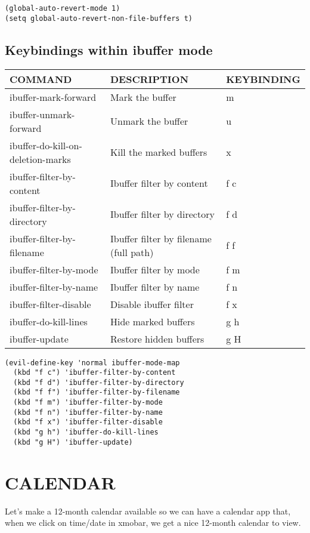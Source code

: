 \documentclass[11pt]{article}
\begin{document}
\begin{verbatim}
(global-auto-revert-mode 1)
(setq global-auto-revert-non-file-buffers t)
\end{verbatim}

\subsection{Keybindings within ibuffer mode}
\label{sec:org6013ae8}
\begin{center}
\begin{tabular}{lll}
COMMAND & DESCRIPTION & KEYBINDING\\[0pt]
\hline
ibuffer-mark-forward & Mark the buffer & m\\[0pt]
ibuffer-unmark-forward & Unmark the buffer & u\\[0pt]
ibuffer-do-kill-on-deletion-marks & Kill the marked buffers & x\\[0pt]
ibuffer-filter-by-content & Ibuffer filter by content & f c\\[0pt]
ibuffer-filter-by-directory & Ibuffer filter by directory & f d\\[0pt]
ibuffer-filter-by-filename & Ibuffer filter by filename (full path) & f f\\[0pt]
ibuffer-filter-by-mode & Ibuffer filter by mode & f m\\[0pt]
ibuffer-filter-by-name & Ibuffer filter by name & f n\\[0pt]
ibuffer-filter-disable & Disable ibuffer filter & f x\\[0pt]
ibuffer-do-kill-lines & Hide marked buffers & g h\\[0pt]
ibuffer-update & Restore hidden buffers & g H\\[0pt]
\end{tabular}
\end{center}

\begin{verbatim}
(evil-define-key 'normal ibuffer-mode-map
  (kbd "f c") 'ibuffer-filter-by-content
  (kbd "f d") 'ibuffer-filter-by-directory
  (kbd "f f") 'ibuffer-filter-by-filename
  (kbd "f m") 'ibuffer-filter-by-mode
  (kbd "f n") 'ibuffer-filter-by-name
  (kbd "f x") 'ibuffer-filter-disable
  (kbd "g h") 'ibuffer-do-kill-lines
  (kbd "g H") 'ibuffer-update)
\end{verbatim}

\section{CALENDAR}
\label{sec:orga36f254}
Let's make a 12-month calendar available so we can have a calendar app that, when we click on time/date in xmobar, we get a nice 12-month calendar to view.
\end{document}
